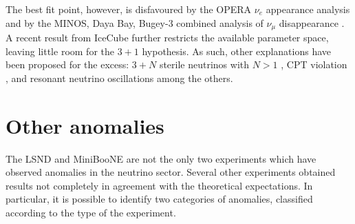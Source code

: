 The best fit point, however, is disfavoured by the OPERA $\nu_{e}$ appearance analysis \cite{Agafonova:2018dkb} and by the MINOS, Daya Bay, Bugey-3 combined analysis of $\nu_{\mu}$ disappearance \cite{Adamson:2016jku}. A recent result from IceCube \cite{TheIceCube:2016oqi} further restricts the available parameter space, leaving little room for the $3+1$ hypothesis. As such, other explanations have been proposed for the excess: $3+N$ sterile neutrinos with $N>1$ \cite{Conrad:2012qt}, CPT violation \cite{Kostelecky:2011gq}, and resonant neutrino oscillations \cite{Asaadi:2017bhx} among the others.


\section{Other anomalies}
The LSND and MiniBooNE are not the only two experiments which have observed anomalies in the neutrino sector. Several other experiments obtained results not completely in agreement with the theoretical expectations. In particular, it is possible to identify two categories of anomalies, classified according to the type of the experiment.
